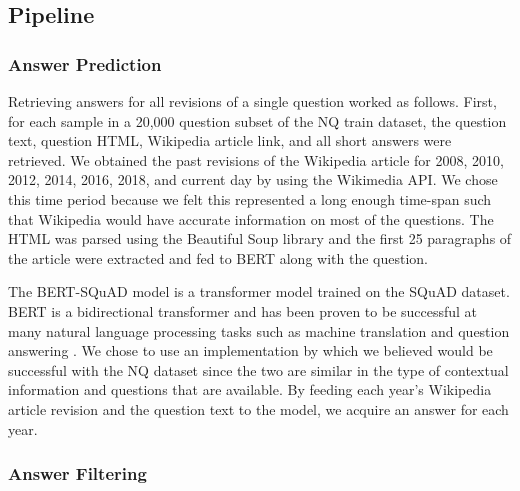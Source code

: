 \documentclass{article}
\begin{document}
\subsection{Pipeline}
\label{pipeline}


\subsubsection{Answer Prediction}
Retrieving answers for all revisions of a single question worked as follows.
First, for each sample in a 20,000 question subset of the NQ train dataset, the
question text, question HTML, Wikipedia article link, and all short answers were
retrieved. We obtained the past revisions of the Wikipedia article for 2008,
2010, 2012, 2014, 2016, 2018, and current day by using the Wikimedia API. We
chose this time period because we felt this represented a long enough time-span
such that Wikipedia would have accurate information on most of the questions.
The HTML was parsed using the Beautiful Soup library and the first 25 paragraphs
of the article were extracted and fed to BERT along with the question.

The BERT-SQuAD model is a transformer model trained on the SQuAD dataset. BERT
is a bidirectional transformer and has been proven to be successful at many
natural language processing tasks such as machine translation and question
answering \cite{bert}. We chose to use an implementation by \cite{bertsquad}
which we believed would be successful with the NQ dataset since the two are
similar in the type of contextual information and questions that are available.
By feeding each year’s Wikipedia article revision and the question text to the
model, we acquire an answer for each year.

\subsubsection{Answer Filtering}

\end{document}
